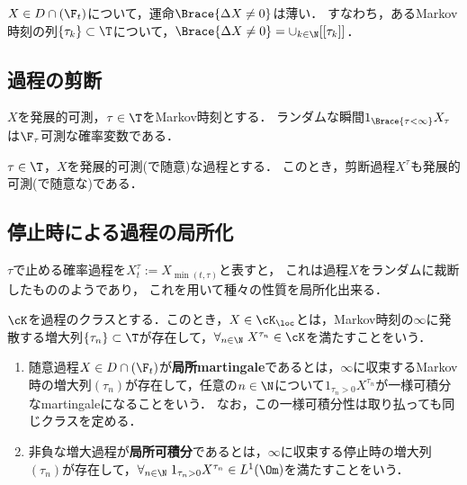 \documentclass[uplatex,dvipdfmx]{jsreport}
\begin{document}
\begin{theorem}[$D$-過程のジャンプにはMarkov時刻を当てることが出来る]
    $X\in D\cap(\F_t)$について，運命$\Brace{\Delta X\ne0}$は薄い．
    すなわち，あるMarkov時刻の列$\{\tau_k\}\subset\T$について，$\Brace{\Delta X\ne0}=\cup_{k\in\N}[[\tau_k]]$．
\end{theorem}

\subsection{過程の剪断}

\begin{theorem}[発展的可測過程のランダムな停止]
    $X$を発展的可測，$\tau\in\T$をMarkov時刻とする．
    ランダムな瞬間$1_{\Brace{\tau<\infty}}X_\tau$は$\F_\tau$可測な確率変数である．
\end{theorem}

\begin{theorem}
    $\tau\in\T$，$X$を発展的可測(で随意)な過程とする．
    このとき，剪断過程$X^\tau$も発展的可測(で随意な)である．
\end{theorem}

\subsection{停止時による過程の局所化}

\begin{tcolorbox}[colframe=ForestGreen, colback=ForestGreen!10!white,breakable,colbacktitle=ForestGreen!40!white,coltitle=black,fonttitle=\bfseries\sffamily,
title=]
    $\tau$で止める確率過程を$X^\tau_t:=X_{\min(t,\tau)}$と表すと，
    これは過程$X$をランダムに裁断したもののようであり，
    これを用いて種々の性質を局所化出来る．
\end{tcolorbox}

\begin{definition}
    $\cK$を過程のクラスとする．このとき，$X\in\cK_\loc$とは，Markov時刻の$\infty$に発散する増大列$\{\tau_n\}\subset\T$が存在して，$\forall_{n\in\N}\;X^{\tau_n}\in\cK$を満たすことをいう．
    \begin{enumerate}
        \item 随意過程$X\in D\cap(\F_t)$が\textbf{局所martingale}であるとは，$\infty$に収束するMarkov時の増大列$(\tau_n)$が存在して，任意の$n\in\N$について$1_{\tau_n>0}X^{\tau_n}$が一様可積分なmartingaleになることをいう．
        なお，この一様可積分性は取り払っても同じクラスを定める．
        \item 非負な増大過程が\textbf{局所可積分}であるとは，$\infty$に収束する停止時の増大列$(\tau_n)$が存在して，$\forall_{n\in\N}\;1_{\tau_n>0}X^{\tau_n}\in L^1(\Om)$を満たすことをいう．
    \end{enumerate}
\end{definition}
\end{document}
